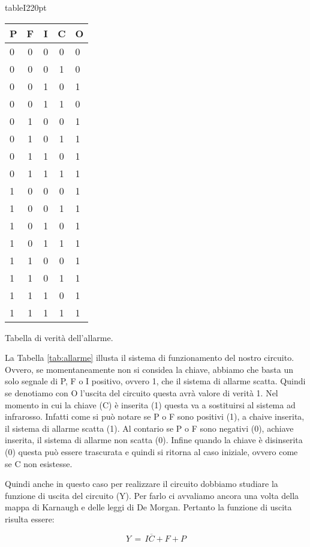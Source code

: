 \begin{wrapfloat}{table}{I}{220pt}
\centering
\begin{tabular}{l c c c | l}
	\toprule
		P & F & I & C & O \\
	\midrule
		0 & 0 & 0 & 0 & 0 \\
		0 & 0 & 0 & 1 & 0 \\
		0 & 0 & 1 & 0 & 1 \\
		0 & 0 & 1 & 1 & 0 \\
		0 & 1 & 0 & 0 & 1 \\
		0 & 1 & 0 & 1 & 1 \\
		0 & 1 & 1 & 0 & 1 \\
		0 & 1 & 1 & 1 & 1 \\
		1 & 0 & 0 & 0 & 1 \\
		1 & 0 & 0 & 1 & 1 \\
		1 & 0 & 1 & 0 & 1 \\
		1 & 0 & 1 & 1 & 1 \\
		1 & 1 & 0 & 0 & 1 \\
		1 & 1 & 0 & 1 & 1 \\
		1 & 1 & 1 & 0 & 1 \\
		1 & 1 & 1 & 1 & 1 \\
	\bottomrule
\end{tabular}
\caption{Tabella di verità dell'allarme.}
\label{tab:allarme}
\end{wrapfloat}

La Tabella \ref{tab:allarme} illusta il sistema di funzionamento del nostro circuito. Ovvero, se momentaneamente non si considea la chiave, abbiamo che basta un solo segnale di P, F o I positivo, ovvero 1, che il sistema di allarme scatta. Quindi se denotiamo con O l'uscita del circuito questa avrà valore di verità 1. Nel momento in cui la chiave (C) è inserita (1) questa va a sostituirsi al sistema ad infrarosso. Infatti come si può notare se P o F sono positivi (1), a chaive inserita, il sistema di allarme scatta (1). Al contario se P o F sono negativi (0), achiave inserita, il sistema di allarme non scatta (0). Infine quando la chiave è disinserita (0) questa può essere trascurata e quindi si ritorna al caso iniziale, ovvero come se C non esistesse.

Quindi anche in questo caso per realizzare il circuito dobbiamo studiare la funzione di uscita del circuito (Y). Per farlo ci avvaliamo ancora una volta della mappa di Karnaugh e delle leggi di De Morgan. Pertanto la funzione di uscita risulta essere:

\begin{equation*}
	Y\,=\,I\overline{C} + F + P
\end{equation*} 

